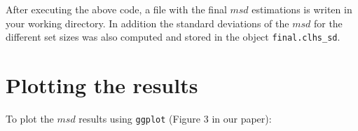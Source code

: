 \documentclass[]{book}
\newenvironment{Shaded}{\begin{snugshade}}{\end{snugshade}}
\newcommand{\CharTok}[1]{\textcolor[rgb]{0.31,0.60,0.02}{#1}}
\newcommand{\ControlFlowTok}[1]{\textcolor[rgb]{0.13,0.29,0.53}{\textbf{#1}}}
\newcommand{\DataTypeTok}[1]{\textcolor[rgb]{0.13,0.29,0.53}{#1}}
\newcommand{\DecValTok}[1]{\textcolor[rgb]{0.00,0.00,0.81}{#1}}
\newcommand{\FloatTok}[1]{\textcolor[rgb]{0.00,0.00,0.81}{#1}}
\newcommand{\KeywordTok}[1]{\textcolor[rgb]{0.13,0.29,0.53}{\textbf{#1}}}
\newcommand{\NormalTok}[1]{#1}
\newcommand{\OperatorTok}[1]{\textcolor[rgb]{0.81,0.36,0.00}{\textbf{#1}}}
\newcommand{\StringTok}[1]{\textcolor[rgb]{0.31,0.60,0.02}{#1}}
\begin{document}
\begin{Shaded}
\end{Shaded}

After executing the above code, a file with the final \(msd\) estimations is writen in your working directory. In addition the standard deviations of the \(msd\) for the different set sizes was also computed and stored in the object \texttt{final.clhs\_sd}.

\hypertarget{plotting-the-results}{%
\section{Plotting the results}\label{plotting-the-results}}

To plot the \(msd\) results using \texttt{ggplot} (Figure 3 in our paper):
\end{document}
